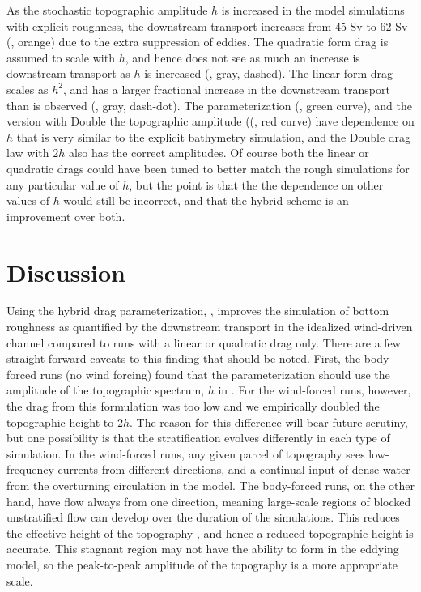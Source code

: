 \documentclass[twocol]{ametsocV5}
\begin{document}
As the stochastic topographic amplitude $h$ is increased in the model simulations with explicit roughness, the downstream transport increases from 45 Sv to 62 Sv (, orange) due to the extra suppression of eddies.  The quadratic form drag is assumed to scale with $h$, and hence does not see as much an increase is downstream transport as $h$ is increased (, gray, dashed).  The linear form drag scales as $h^2$, and has a larger fractional increase in the downstream transport than is observed (, gray, dash-dot).  The parameterization (, green curve), and the version with {\sc Double} the topographic amplitude ((, red curve)  have  dependence on $h$ that is very similar to the explicit bathymetry simulation, and the {\sc Double} drag law with $2h$ also has the correct amplitudes.  Of course both the linear or quadratic drags could have been tuned to better match the rough simulations for any particular value of $h$, but the point is that the the dependence on other values of $h$ would still be incorrect, and that the hybrid scheme is an improvement over both.     

\clearpage
\section{Discussion}

Using the hybrid drag parameterization, , improves the simulation of bottom roughness as quantified by the downstream transport in the idealized wind-driven channel compared to runs with a linear or quadratic drag only.  There are a few straight-forward caveats to this finding that should be noted.  First, the body-forced runs (no wind forcing) found that the parameterization  should use the amplitude of the topographic spectrum, $h$ in . For the wind-forced runs, however, the drag from this formulation was too low and we empirically doubled the topographic height to $2h$.  The reason for this difference will bear future scrutiny, but one possibility is that the stratification evolves differently in each type of simulation.  In the wind-forced runs, any given parcel of topography sees low-frequency currents from different directions, and a continual input of dense water from the overturning circulation in the model.  The body-forced runs, on the other hand, have flow always from one direction, meaning large-scale regions of blocked unstratified flow can develop over the duration of the simulations.  This reduces the effective height of the topography \citep[i.e.][]{aguilarsutherland06}, and hence a reduced topographic height is accurate.  This stagnant region may not have the ability to form in the eddying model, so the peak-to-peak amplitude of the topography is a more appropriate scale.
\end{document}
